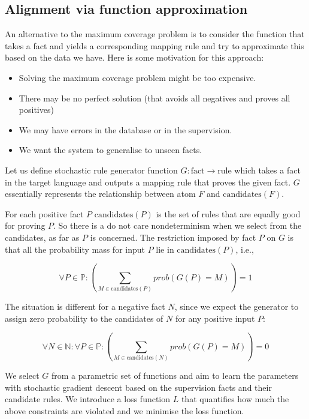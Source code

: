 \documentclass{easychair}
\begin{document}
\subsection{Alignment via function approximation}

An alternative to the maximum coverage problem is to consider the
function that takes a fact and yields a corresponding mapping rule and
try to approximate this based on the data we have. Here is some
motivation for this approach:

\begin{itemize}
\item Solving the maximum coverage problem might be too expensive.
\item There may be no perfect solution (that avoids all negatives and proves all positives)
\item We may have errors in the database or in the supervision.
\item We want the system to generalise to unseen facts.
\end{itemize}

Let us define stochastic rule generator function $G:\mbox{fact}
\rightarrow \mbox{rule}$ which takes a fact in the target language and
outputs a mapping rule that proves the given fact. $G$ essentially
represents the relationship between atom $F$ and
$\mbox{candidates}(F)$.

For each positive fact $P$ $\mbox{candidates}(P)$ is the set of rules
that are equally good for proving $P$. So there is a do not care
nondeterminism when we select from the candidates, as far as $P$ is
concerned. The restriction imposed by fact $P$ on $G$ is that all the
probability mass for input $P$ lie in $\mbox{candidates}(P)$, i.e.,

$$\forall P \in \mathbb{P}: \left(\sum_{M \in \mbox{candidates}(P)} prob(G(P) = M)\right) = 1$$

The situation is different for a negative fact $N$, since we expect
the generator to assign zero probability to the candidates of $N$ for
any positive input $P$:

$$\forall N \in \mathbb{N}: \forall P \in \mathbb{P}: \left(\sum_{M \in \mbox{candidates}(N)} prob(G(P) = M)\right) = 0$$

We select $G$ from a parametric set of functions and aim to learn the
parameters with stochastic gradient descent based on the supervision
facts and their candidate rules. We introduce a loss function $L$ that
quantifies how much the above constraints are violated and we minimise the loss function.
\end{document}
